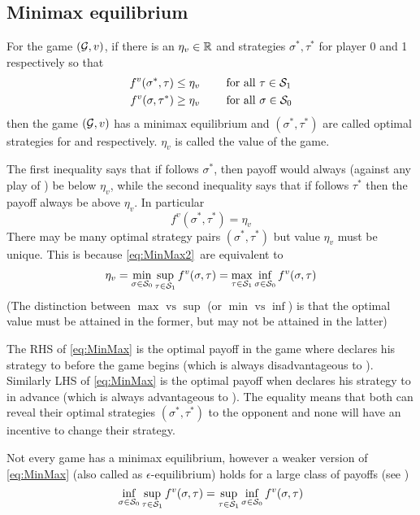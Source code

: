 \subsection{Minimax equilibrium}
For the game $(\mathcal{G},v)$, if there is an $\eta_v \in \mathbb{R}$ and strategies $\sigma^*,\tau^*$ for player 0 and 1 respectively so that
\begin{equation}
\begin{aligned}
    f^v(\sigma^*,\tau) \leq \eta_v \qquad & \text{ for all } \tau \in \mathcal{S}_1 \\
    f^v(\sigma, \tau^*)  \geq \eta_v \qquad & \text{ for all } \sigma \in \mathcal{S}_0 
\end{aligned} \label{eq:MinMax2}
\end{equation}
\newcommand{\eqminmax}{\eqref{eq:MinMax2}\ }
then the game $(\mathcal{G},v)$ has a minimax equilibrium and $(\sigma^*,\tau^*)$ are called optimal strategies for  and  respectively. $\eta_v$ is called the value of the game.

The first inequality says that if  follows $\sigma^*$, then payoff would always (against any play of ) be below $\eta_v$, while the second inequality says that if  follows $\tau^*$ then the payoff always be above $\eta_v$. In particular
\[
    f^v(\sigma^*,\tau^*) = \eta_v
\]
There may be many optimal strategy pairs $(\sigma^*,\tau^*)$ but value $\eta_v$ must be unique. This is because
\eqminmax are equivalent to
\begin{align}
    \eta_v = \min_{\sigma \in \mathcal{S}_0} \sup_{\tau \in \mathcal{S}_1} f^v(\sigma, \tau) = \max_{\tau \in \mathcal{S}_1} \inf_{\sigma \in \mathcal{S}_0 } f^v(\sigma,\tau) \label{eq:MinMax}
\end{align}
(The distinction between $\max \text{ vs } \sup$ (or $\min \text{ vs } \inf$) is that the optimal value must be attained in the former, but may not be attained in the latter)

The RHS of \eqref{eq:MinMax} is the optimal payoff in the game where  declares his strategy to  before the game begins (which is always disadvantageous to ). Similarly LHS of \eqref{eq:MinMax} is the optimal payoff when  declares his strategy to  in advance (which is always advantageous to ). The equality means that both can reveal their optimal strategies $(\sigma^*,\tau^*)$ to the opponent and none will have an incentive to change their strategy.

Not every game has a minimax equilibrium, however a weaker version of \eqref{eq:MinMax} (also called as $\epsilon$-equilibrium) holds for a large class of payoffs (see  \cite{roux_equilibria})
\[
    \inf_{\sigma \in \mathcal{S}_0} \sup_{\tau \in \mathcal{S}_1} f^v(\sigma, \tau) = \sup_{\tau \in \mathcal{S}_1} \inf_{\sigma \in \mathcal{S}_0 } f^v(\sigma,\tau)
\]

